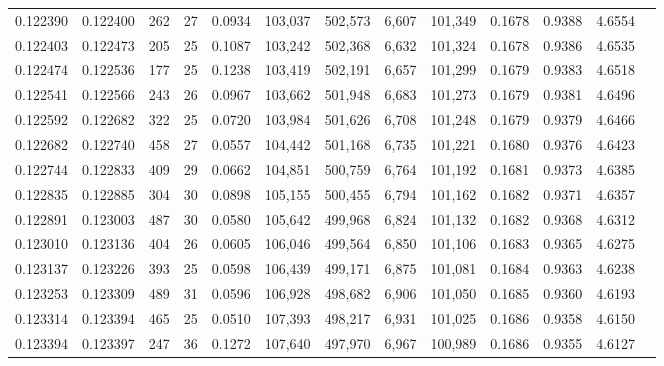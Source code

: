 \begin{tabular}{rrrrrrrrrrrrr}
0.122390 & 0.122400 &   262 &  27 &                                     0.0934 & 103,037 & 502,573 &   6,607 & 101,349 & 0.1678 & 0.9388 & 4.6554 \\
0.122403 & 0.122473 &   205 &  25 &                                     0.1087 & 103,242 & 502,368 &   6,632 & 101,324 & 0.1678 & 0.9386 & 4.6535 \\
0.122474 & 0.122536 &   177 &  25 &                                     0.1238 & 103,419 & 502,191 &   6,657 & 101,299 & 0.1679 & 0.9383 & 4.6518 \\
0.122541 & 0.122566 &   243 &  26 &                                     0.0967 & 103,662 & 501,948 &   6,683 & 101,273 & 0.1679 & 0.9381 & 4.6496 \\
0.122592 & 0.122682 &   322 &  25 &                                     0.0720 & 103,984 & 501,626 &   6,708 & 101,248 & 0.1679 & 0.9379 & 4.6466 \\
0.122682 & 0.122740 &   458 &  27 &                                     0.0557 & 104,442 & 501,168 &   6,735 & 101,221 & 0.1680 & 0.9376 & 4.6423 \\
0.122744 & 0.122833 &   409 &  29 &                                     0.0662 & 104,851 & 500,759 &   6,764 & 101,192 & 0.1681 & 0.9373 & 4.6385 \\
0.122835 & 0.122885 &   304 &  30 &                                     0.0898 & 105,155 & 500,455 &   6,794 & 101,162 & 0.1682 & 0.9371 & 4.6357 \\
0.122891 & 0.123003 &   487 &  30 &                                     0.0580 & 105,642 & 499,968 &   6,824 & 101,132 & 0.1682 & 0.9368 & 4.6312 \\
0.123010 & 0.123136 &   404 &  26 &                                     0.0605 & 106,046 & 499,564 &   6,850 & 101,106 & 0.1683 & 0.9365 & 4.6275 \\
0.123137 & 0.123226 &   393 &  25 &                                     0.0598 & 106,439 & 499,171 &   6,875 & 101,081 & 0.1684 & 0.9363 & 4.6238 \\
0.123253 & 0.123309 &   489 &  31 &                                     0.0596 & 106,928 & 498,682 &   6,906 & 101,050 & 0.1685 & 0.9360 & 4.6193 \\
0.123314 & 0.123394 &   465 &  25 &                                     0.0510 & 107,393 & 498,217 &   6,931 & 101,025 & 0.1686 & 0.9358 & 4.6150 \\
0.123394 & 0.123397 &   247 &  36 &                                     0.1272 & 107,640 & 497,970 &   6,967 & 100,989 & 0.1686 & 0.9355 & 4.6127 \\

\end{tabular}
